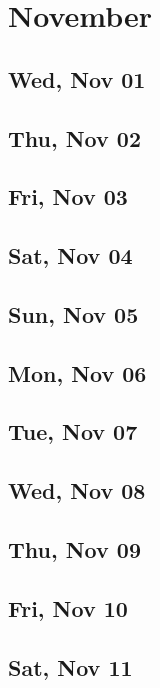 \chapter{November}
	\section{Wed, Nov 01}
		
	\section{Thu, Nov 02}
		
	\section{Fri, Nov 03}
		
	\section{Sat, Nov 04}
		
	\section{Sun, Nov 05}
		
	\section{Mon, Nov 06}
		
	\section{Tue, Nov 07}
		
	\section{Wed, Nov 08}
		
	\section{Thu, Nov 09}
		
	\section{Fri, Nov 10}
		
	\section{Sat, Nov 11}
		
